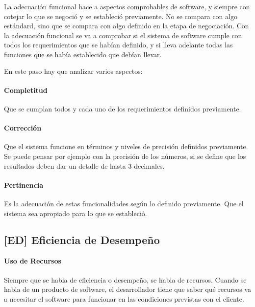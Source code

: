 La adecuación funcional hace a aspectos comprobables de software, y
siempre con cotejar lo que se negoció y se estableció previamente. No se
compara con algo estándard, sino que se compara con algo definido en la
etapa de negociación. Con la adecuación funcional se va a comprobar si
el sistema de software cumple con todos los requerimientos que se habían
definido, y si lleva adelante todas las funciones que se había
establecido que debían llevar.

En este paso hay que analizar varios aspectos:

\hypertarget{completitud}{%
\paragraph{Completitud}\label{completitud}}
  Que se cumplan todos y cada uno de los requerimientos definidos previamente.
\hypertarget{correccion}{%
\paragraph{Corrección}\label{correccion}}
 Que el sistema funcione en términos y niveles de
  precisión definidos previamente. Se puede pensar por ejemplo con la
  precisión de los números, si se define que los resultados deben dar un
  detalle de hasta 3 decimales.
\hypertarget{pertinencia}{%
\paragraph{Pertinencia}\label{pertinencia}}
  Es la adecuación de estas funcionalidades según
  lo definido previamente. Que el sistema sea apropiado para lo que se
  estableció.
\hypertarget{eficiencia-de-desempeuxf1o-ed}{%
\subsection{%
{[}ED{]}
Eficiencia de Desempeño
}\label{eficiencia-de-desempeuxf1o-ed}}

\paragraph{Uso de Recursos}
Siempre que se habla de eficiencia o desempeño, se habla de recursos.
Cuando se habla de un producto de software, el desarrollador tiene que
saber qué recursos va a necesitar el software para funcionar en las
condiciones previstas con el cliente.

